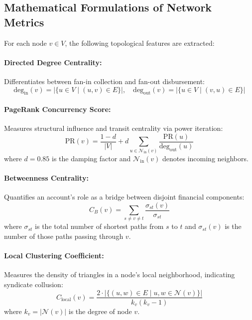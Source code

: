\subsection{Mathematical Formulations of Network Metrics}
For each node $v \in V$, the following topological features are extracted:

\paragraph{Directed Degree Centrality:}
Differentiates between fan-in collection and fan-out disbursement:
\begin{equation}
    \text{deg}_{\text{in}}(v) = |\{u \in V \mid (u, v) \in E\}|, \quad \text{deg}_{\text{out}}(v) = |\{u \in V \mid (v, u) \in E\}|
\end{equation}

\paragraph{PageRank Concurrency Score:}
Measures structural influence and transit centrality via power iteration:
\begin{equation}
    \text{PR}(v) = \frac{1 - d}{|V|} + d \sum_{u \in \mathcal{N}_{\text{in}}(v)} \frac{\text{PR}(u)}{\text{deg}_{\text{out}}(u)}
\end{equation}
where $d = 0.85$ is the damping factor and $\mathcal{N}_{\text{in}}(v)$ denotes incoming neighbors.

\paragraph{Betweenness Centrality:}
Quantifies an account's role as a bridge between disjoint financial components:
\begin{equation}
    C_B(v) = \sum_{s \neq v \neq t} \frac{\sigma_{st}(v)}{\sigma_{st}}
\end{equation}
where $\sigma_{st}$ is the total number of shortest paths from $s$ to $t$ and $\sigma_{st}(v)$ is the number of those paths passing through $v$.

\paragraph{Local Clustering Coefficient:}
Measures the density of triangles in a node's local neighborhood, indicating syndicate collusion:
\begin{equation}
    C_{\text{local}}(v) = \frac{2 \cdot |\{(u, w) \in E \mid u, w \in \mathcal{N}(v)\}|}{k_v (k_v - 1)}
\end{equation}
where $k_v = |\mathcal{N}(v)|$ is the degree of node $v$.


